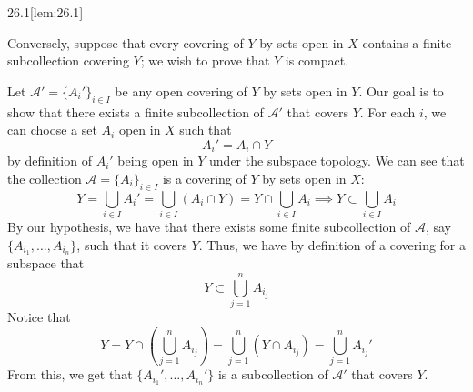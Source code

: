 \begin{thmBox}[Lemma]{26.1}[lem:26.1]
\begin{proofBox}
        \baseSkip

        Conversely, suppose that every covering of \( Y \) by sets open in 
        \( X \) contains a finite subcollection covering \( Y \); we wish to 
        prove that \( Y \) is compact.

        \baseSkip

        Let \( \mathcal{A}' = \{ A_{ i }' \}_{ i \in I } \) be any open 
        covering of \( Y \) by sets open in \( Y \).
        Our goal is to show that there exists a finite subcollection of 
        \( \mathcal{A}' \) that covers \( Y \).
        For each \( i \), we can choose a set \( A_{ i } \) open in \( X \)
        such that 
        \begin{equation*}
            A_{ i }'
            =
            A_{ i } \cap Y
        \end{equation*}
        by definition of \( A_{ i }' \) being open in \( Y \) under the subspace
        topology.
        We can see that the collection \( \mathcal{A} = 
        \{ A_{ i } \}_{ i \in I } \) is a covering of \( Y \) by sets open in 
        \( X \):
        \begin{equation*}
            Y 
            = 
            \bigcup_{ i \in I } A_{ i }'
            =
            \bigcup_{ i \in I } ( A_{ i } \cap Y )
            =
            Y \cap \bigcup_{ i \in I } A_{ i }
            \implies 
            Y \subset \bigcup_{ i \in I } A_{ i }
        \end{equation*}
        By our hypothesis, we have that there exists some finite subcollection
        of \( \mathcal{A} \), say \( \{ A_{ i_{ 1 } } , \ldots , 
        A_{ i_{ n } } \} \), such that it covers \( Y \).
        Thus, we have by definition of a covering for a subspace that
        \begin{equation*}
            Y
            \subset
            \bigcup_{ j = 1 }^{ n } A_{ i_{ j } }
        \end{equation*}
        Notice that 
        \begin{equation*}
            Y
            =
            Y \cap \left( \bigcup_{ j = 1 }^{ n } A_{ i_{ j } } \right)
            =
            \bigcup_{ j = 1 }^{ n } ( Y \cap A_{ i_{ j } } )
            =
            \bigcup_{ j = 1 }^{ n } A_{ i_{ j } }'
        \end{equation*}
        From this, we get that \( \{ A_{ i_{ 1 } }' , \ldots , 
        A_{ i_{ n } }' \} \) is a subcollection of \( \mathcal{A}' \) that
        covers \( Y \).
    \end{proofBox}
\end{thmBox}

